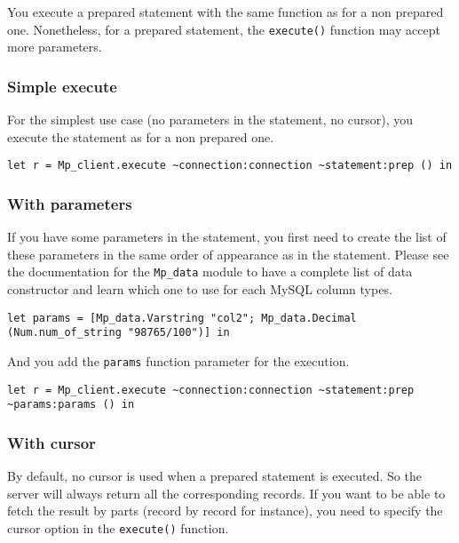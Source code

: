 \documentclass[a4paper, english, 11pt]{article}
\begin{document}
You execute a prepared statement with the same function as for a non prepared one. Nonetheless, for a prepared statement, the \texttt{execute()} function may accept more parameters.

\subsubsection{Simple execute}

For the simplest use case (no parameters in the statement, no cursor), you execute the statement as for a non prepared one.

\begin{lstlisting}
let r = Mp_client.execute ~connection:connection ~statement:prep () in
\end{lstlisting}

\subsubsection{With parameters}

If you have some parameters in the statement, you first need to create the list of these parameters in the same order of appearance as in the statement. Please see the documentation for the \texttt{Mp\_data} module to have a complete list of data constructor and learn which one to use for each MySQL column types.

\begin{lstlisting}
let params = [Mp_data.Varstring "col2"; Mp_data.Decimal (Num.num_of_string "98765/100")] in
\end{lstlisting}

And you add the \texttt{params} function parameter for the execution.

\begin{lstlisting}
let r = Mp_client.execute ~connection:connection ~statement:prep ~params:params () in
\end{lstlisting}

\subsubsection{With cursor}

By default, no cursor is used when a prepared statement is executed. So the server will always return all the corresponding records. If you want to be able to fetch the result by parts (record by record for instance), you need to specify the cursor option in the \texttt{execute()} function.
\end{document}
